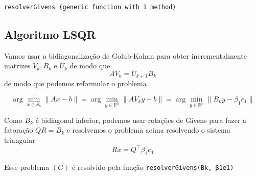 \documentclass[11pt]{article}
\makeatletter
\newcommand{\boxspacing}{\kern\kvtcb@left@rule\kern\kvtcb@boxsep}
\newcommand{\prompt}[4]{
        {\ttfamily\llap{{\color{#2}[#3]:\hspace{3pt}#4}}\vspace{-\baselineskip}}
    }
\makeatother
\begin{document}
            \begin{tcolorbox}[breakable, size=fbox, boxrule=.5pt, pad at break*=1mm, opacityfill=0]
\prompt{Out}{outcolor}{ }{\boxspacing}
\begin{Verbatim}[commandchars=\\\{\}]
resolverGivens (generic function with 1 method)
\end{Verbatim}
\end{tcolorbox}
        
    \hypertarget{algoritmo-lsqr}{%
\subsection*{Algoritmo LSQR}\label{algoritmo-lsqr}}

Vamos usar a bidiagonalização de Golub-Kahan para obter incrementalmente
matrizes \(V_k, B_k\) e \(U_k\) de modo que \[AV_k = U_{k+1}B_k\] de
modo que podemos reformular o problema

\[\arg\min_{x\in S_k} \|Ax-b\| = \arg\min_{y\in\mathbb{R}^n}\|AV_ky-b\| = \arg\min_{y\in\mathbb{R}^n} \|B_ky-\beta_1e_1\| \tag{$\star$}\]

Como \(B_k\) é bidiagonal inferior, podemos usar rotações de Givens para
fazer a fatoração \(QR = B_k\) e resolvemos o problema acima resolvendo
o sistema triangular\\
\[Rx = Q^\top\beta_1e_1 \tag{G}\]

Esse problema \((G)\) é resolvido pela função
\texttt{resolverGivens(Bk,\ β1e1)}
\end{document}
